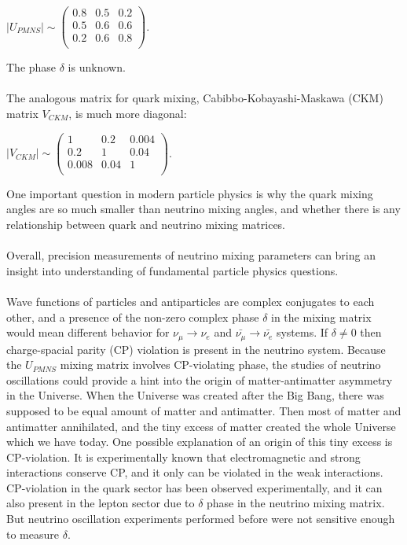 \begin{center}
$|U_{PMNS}| \sim
 \begin{pmatrix}
  0.8 & 0.5 & 0.2 \\ 0.5 & 0.6 & 0.6 \\ 0.2 & 0.6 & 0.8 \\
 \end{pmatrix}$.\\
\end{center}
The phase $\delta$ is unknown.\\ \\
The analogous matrix for quark mixing, Cabibbo-Kobayashi-Maskawa (CKM) matrix $V_{CKM}$, is much more diagonal:\\
\begin{center}
$|V_{CKM}| \sim
 \begin{pmatrix}
  1 & 0.2 & 0.004 \\ 0.2 & 1 & 0.04 \\ 0.008 & 0.04 & 1 \\
 \end{pmatrix}$.\\
\end{center}
One important question in modern particle physics is why the quark mixing angles are so much smaller than neutrino mixing angles, and whether there is any relationship between quark and neutrino mixing matrices.\\ \\
Overall, precision measurements of neutrino mixing parameters can bring an insight into understanding of fundamental particle physics questions.\\ \\
Wave functions of particles and antiparticles are complex conjugates to each other, and a presence of the non-zero complex phase $\delta$ in the mixing matrix would mean different behavior for $\nu_\mu \rightarrow \nu_e$ and $\bar{\nu_\mu} \rightarrow \bar{\nu_e}$ systems. If $\delta \neq 0$ then charge-spacial parity (CP) violation is present in the neutrino system. Because the $U_{PMNS}$ mixing matrix involves CP-violating phase, the studies of neutrino oscillations could provide a hint into the origin of matter-antimatter asymmetry in the Universe. When the Universe was created after the Big Bang, there was supposed to be equal amount of matter and antimatter. Then most of matter and antimatter annihilated, and the tiny excess of matter created the whole Universe which we have today. One possible explanation of an origin of this tiny excess is CP-violation. It is experimentally known that electromagnetic and strong interactions conserve CP, and it only can be violated in the weak interactions. CP-violation in the quark sector has been observed experimentally, and it can also present in the lepton sector due to $\delta$ phase in the neutrino mixing matrix. But neutrino oscillation experiments performed before were not sensitive enough to measure $\delta$.\\ \\
